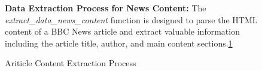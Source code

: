 \documentclass[10pt]{article}
\begin{document}
\begin{figure}[htbp]
    \centering
    \begin{minipage}[t]{0.35\textwidth}
        \caption{Ariticle Content Extraction Process}
        \label{fig:newscontent}
    \end{minipage}
    \hfill
    \begin{minipage}[t]{0.6\textwidth}
    \textbf{Data Extraction Process for News Content:}
    The \textit{extract\_data\_news\_content} function is designed to parse the HTML content of a BBC News article and extract valuable information including the article title, author, and main content sections.\ref{fig:newscontent}


\end{minipage}
\end{figure}
\end{document}
